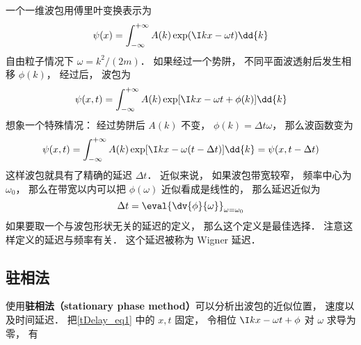 
一个一维波包用傅里叶变换表示为
\begin{equation}
\psi(x) = \int_{-\infty}^{+\infty} A(k) \exp(\I kx - \omega t) \dd{k}
\end{equation}
自由粒子情况下 $\omega = k^2/(2m)$． 如果经过一个势阱， 不同平面波透射后发生相移 $\phi(k)$， 经过后， 波包为
\begin{equation}\label{tDelay_eq1}
\psi(x, t) = \int_{-\infty}^{+\infty} A(k) \exp[\I kx - \omega t + \phi(k)] \dd{k}
\end{equation}
想象一个特殊情况： 经过势阱后 $A(k)$ 不变， $\phi(k) = \Delta t \omega$， 那么波函数变为
\begin{equation}
\psi(x, t) = \int_{-\infty}^{+\infty} A(k) \exp[\I kx - \omega (t - \Delta t) ] \dd{k}
= \psi(x, t - \Delta t)
\end{equation}
这样波包就具有了精确的延迟 $\Delta t$． 近似来说， 如果波包带宽较窄， 频率中心为 $\omega_0$， 那么在带宽以内可以把 $\phi(\omega)$ 近似看成是线性的， 那么延迟近似为
\begin{equation}
\Delta t = \eval{\dv{\phi}{\omega}}_{\omega = \omega_0}
\end{equation}
如果要取一个与波包形状无关的延迟的定义， 那么这个定义是最佳选择． 注意这样定义的延迟与频率有关． 这个延迟被称为 Wigner 延迟．

\subsection{驻相法}
使用\textbf{驻相法（stationary phase method）}可以分析出波包的近似位置， 速度以及时间延迟． 把\autoref{tDelay_eq1} 中的 $x, t$ 固定， 令相位 $\I kx - \omega t + \phi$ 对 $\omega$ 求导为零， 有

